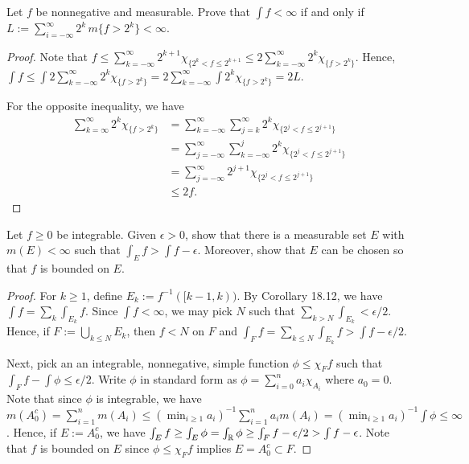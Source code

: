 \documentclass{article}
\newcommand{\m}{\,m}
\begin{document}
 Let $f$ be nonnegative and measurable. Prove that $\int f < \infty$ if and only if $L := \sum_{i=-\infty}^\infty 2^k \m\{ f > 2^k \} < \infty$.
\begin{proof}

Note that $f \le \sum_{k=-\infty}^\infty 2^{k+1} \chi_{\{2^k < f \le 2^{k+1}} \le 2 \sum_{k=-\infty}^\infty 2^{k} \chi_{\{f >2^k \}}$. Hence, $\int f \le \int 2 \sum_{k=-\infty}^\infty 2^{k} \chi_{\{f >2^k \}} = 2 \sum_{k=-\infty}^\infty \int 2^{k} \chi_{\{f >2^k \}} = 2 L$.

For the opposite inequality, we have 
\begin{align*}
\sum_{k=\infty}^\infty 2^{k} \chi_{\{f >2^k \}} & = \sum_{k=-\infty}^\infty \sum_{j=k}^{\infty} 2^k \chi_{\{ 2^j < f \le 2^{j+1}\}}
\\ & = \sum_{j=-\infty}^\infty \sum_{k=-\infty}^{j} 2^k \chi_{\{ 2^j < f \le 2^{j+1}\}} 
\\ & = \sum_{j=-\infty}^\infty 2^{j+1} \chi_{\{ 2^j < f \le 2^{j+1}\}} 
\\ & \le 2f.
\end{align*}

\end{proof}


 Let $f \ge 0$ be integrable. Given $\epsilon >0$, show that there is a measurable set $E$ with $m(E) < \infty$ such that $\int_E f > \int f - \epsilon$. Moreover, show that $E$ can be chosen so that $f$ is bounded on $E$.
\begin{proof}
For $k \ge 1$, define $E_k := f^{-1}([k-1, k))$.  By Corollary 18.12, we have $\int f = \sum_k \int_{E_k} f$. Since $\int f < \infty$, we may pick $N$ such that 
$\sum_{k>N} \int_{E_k} < \epsilon/2$.  Hence, if $F:= \bigcup_{k\le N} E_k$, then $f < N$ on $F$ and $\int_F f =  \sum_{k\le N} \int_{E_k} f > \int f - \epsilon/2$.

Next, pick an an integrable, nonnegative, simple function $\phi \le \chi_F f$ such that $\int_F f - \int \phi \le \epsilon/2$. 
 Write $\phi$ in standard form as $\phi = \sum_{i=0}^n a_i \chi_{A_i}$ where $a_0 = 0$.  Note that since $\phi$ is integrable, we have $m(A_0^c) = \sum_{i=1}^n m(A_i) \le (\min_{i\ge 1} a_i)^{-1} \sum_{i=1}^n a_i m(A_i) = (\min_{i\ge 1} a_i)^{-1} \int \phi \le \infty$. Hence, if $E := A_0^c$, we have $\int_{E} f \ge \int_{E} \phi  = \int_{\mathbb{R}} \phi \ge \int_F f - \epsilon/2 > \int f - \epsilon$. Note that $f$ is bounded on $E$ since $\phi \le \chi_F f$ implies $E = A_0^c \subset F$.

\end{proof}
\end{document}
